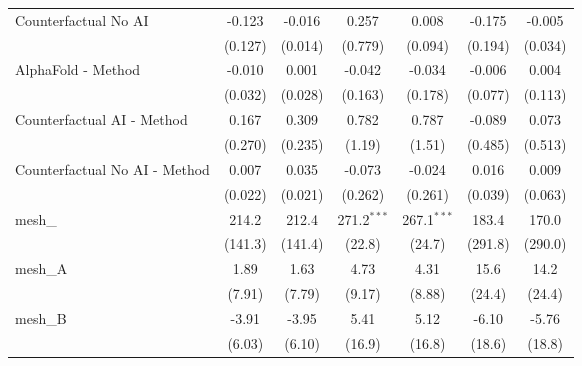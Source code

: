 \begin{tabular}{lcccccc}
   Counterfactual No AI                                        & -0.123       & -0.016       & 0.257          & 0.008          & -0.175  & -0.005\\   
                                                               & (0.127)      & (0.014)      & (0.779)        & (0.094)        & (0.194) & (0.034)\\   
   AlphaFold - Method                                          & -0.010       & 0.001        & -0.042         & -0.034         & -0.006  & 0.004\\   
                                                               & (0.032)      & (0.028)      & (0.163)        & (0.178)        & (0.077) & (0.113)\\   
   Counterfactual AI - Method                                  & 0.167        & 0.309        & 0.782          & 0.787          & -0.089  & 0.073\\   
                                                               & (0.270)      & (0.235)      & (1.19)         & (1.51)         & (0.485) & (0.513)\\   
   Counterfactual No AI - Method                               & 0.007        & 0.035        & -0.073         & -0.024         & 0.016   & 0.009\\   
                                                               & (0.022)      & (0.021)      & (0.262)        & (0.261)        & (0.039) & (0.063)\\   
   mesh\_                                                      & 214.2        & 212.4        & 271.2$^{***}$  & 267.1$^{***}$  & 183.4   & 170.0\\   
                                                               & (141.3)      & (141.4)      & (22.8)         & (24.7)         & (291.8) & (290.0)\\   
   mesh\_A                                                     & 1.89         & 1.63         & 4.73           & 4.31           & 15.6    & 14.2\\   
                                                               & (7.91)       & (7.79)       & (9.17)         & (8.88)         & (24.4)  & (24.4)\\   
   mesh\_B                                                     & -3.91        & -3.95        & 5.41           & 5.12           & -6.10   & -5.76\\   
                                                               & (6.03)       & (6.10)       & (16.9)         & (16.8)         & (18.6)  & (18.8)\\   

\end{tabular}
